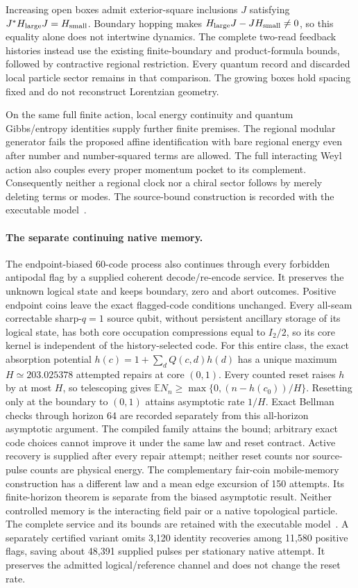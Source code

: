 Increasing open boxes admit exterior-square inclusions $J$ satisfying
$J^*H_{\rm large}J=H_{\rm small}$. Boundary hopping makes
$H_{\rm large}J-JH_{\rm small}\ne0$, so this equality alone does not
intertwine dynamics. The complete two-read feedback histories instead use
the existing finite-boundary and product-formula bounds, followed by
contractive regional restriction. Every quantum record and discarded local
particle sector remains in that comparison. The growing boxes hold
spacing fixed and do not reconstruct Lorentzian geometry.

On the same full finite action, local energy continuity and quantum
Gibbs/entropy identities supply further finite premises. The regional
modular generator fails the proposed affine identification with bare
regional energy even after number and number-squared terms are allowed.
The full interacting Weyl action also couples every proper momentum pocket
to its complement. Consequently neither a regional clock nor a chiral
sector follows by merely deleting terms or modes. The source-bound
construction is recorded with the executable model~\cite{mREADME}.

\paragraph{The separate continuing native memory.}
The endpoint-biased 60-code process also continues through every
forbidden antipodal flag by a supplied coherent decode/re-encode service.
It preserves the unknown logical state and keeps boundary, zero and abort
outcomes. Positive endpoint coins leave the exact flagged-code conditions
unchanged. Every all-seam correctable sharp-$q=1$ source qubit, without
persistent ancillary storage of its logical state, has both core
occupation compressions equal to $I_2/2$, so its core kernel is independent
of the history-selected code. For this entire class, the exact absorption potential
$h(c)=1+\sum_dQ(c,d)h(d)$ has a unique maximum
$H\simeq203.025378$ attempted repairs at core $(0,1)$.
Every counted reset raises $h$ by at most $H$, so telescoping gives
$\mathbb E N_n\ge\max\{0,(n-h(c_0))/H\}$. Resetting only at the
boundary to $(0,1)$ attains asymptotic rate $1/H$. Exact Bellman checks
through horizon 64 are recorded separately from this all-horizon
asymptotic argument. The compiled family attains the bound; arbitrary exact
code choices cannot improve it under the same law and reset contract.
Active recovery is supplied after every repair attempt;
neither reset counts nor source-pulse counts are physical energy.
The complementary fair-coin mobile-memory construction has a different
law and a mean edge excursion of 150 attempts. Its finite-horizon theorem
is separate from the biased asymptotic result. Neither controlled memory is the interacting field pair or a
native topological particle. The complete service and its bounds are
retained with the executable model~\cite{mREADME}. A separately certified variant
omits 3,120 identity recoveries among 11,580 positive flags, saving about
48,391 supplied pulses per stationary native attempt. It preserves the
admitted logical/reference channel and does not change the reset rate.

